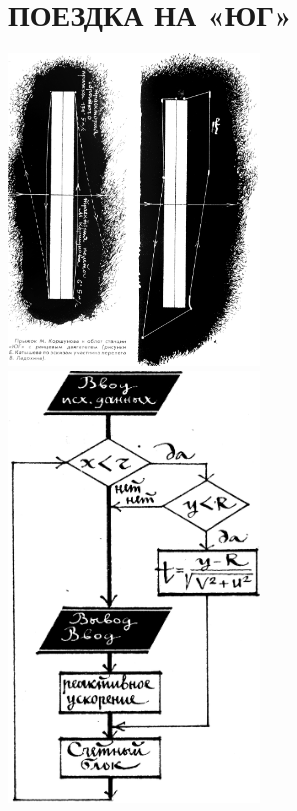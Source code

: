 \documentclass[11pt,a4paper,oneside]{article}
\begin{document}
\section{ПОЕЗДКА НА «ЮГ»}
\includegraphics[width=0.5\textwidth]{jump_to_ug}
\includegraphics[width=0.5\textwidth]{jump_to_ug2}
\end{document}
